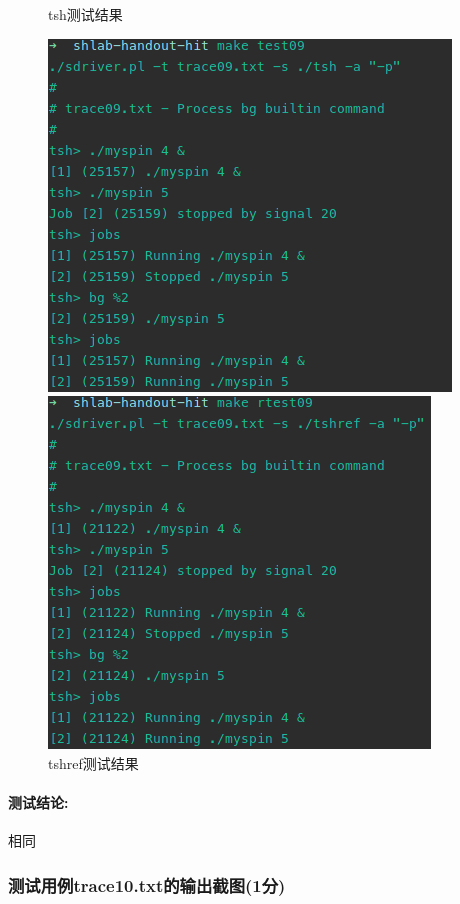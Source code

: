 \begin{figure}[H]
    \begin{minipage}[c]{0.5\linewidth}
        \centering
        \caption{tsh测试结果}
        \includegraphics[width=0.7\linewidth]{figures/test09.png}
    \end{minipage}
    \begin{minipage}[c]{0.5\linewidth}
        \centering
        \caption{tshref测试结果}
        \includegraphics[width=0.65\linewidth]{figures/rtest09.png}
    \end{minipage}
\end{figure}

\paragraph{测试结论:}相同

\subsubsection{测试用例trace10.txt的输出截图(1分)}

